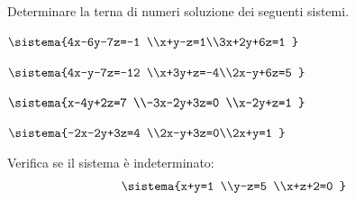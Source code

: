 \pagebreak %

\begin{esercizio}[*]
 \label{ese:22.57}
 Determinare la terna di numeri soluzione dei seguenti sistemi.
\begin{enumeratea}
\item \(\sistema{4x-6y-7z=-1 \\x+y-z=1\\3x+2y+6z=1 
}\)
\item \(\sistema{4x-y-7z=-12 \\x+3y+z=-4\\2x-y+6z=5 
}\)
\item \(\sistema{x-4y+2z=7 \\-3x-2y+3z=0 \\x-2y+z=1 
}\)
\item \(\sistema{-2x-2y+3z=4 \\2x-y+3z=0\\2x+y=1 
}\)
\end{enumeratea}
\end{esercizio}

% 
% 

\begin{esercizio}
 \label{ese:22.62}
Verifica se il sistema è indeterminato:
\[\sistema{x+y=1 \\y-z=5
\\x+z+2=0 }\]
\end{esercizio}

